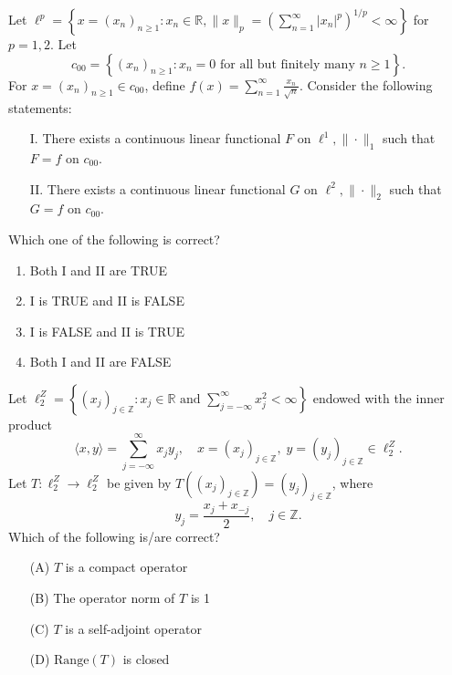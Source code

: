 \item Let $\ell^p = \left\{ x = (x_n)_{n \geq 1} : x_n \in \mathbb{R}, \|x\|_p = \left( \sum_{n=1}^\infty |x_n|^p \right)^{1/p} < \infty \right\}$ for $p = 1, 2$. Let
\[
c_{00} = \left\{ (x_n)_{n \geq 1} : x_n = 0 \text{ for all but finitely many } n \geq 1 \right\}.
\]
For $x = (x_n)_{n \geq 1} \in c_{00}$, define $f(x) = \sum_{n=1}^\infty \frac{x_n}{\sqrt{n}}$. Consider the following statements:
\begin{enumerate}
    \item[I.] There exists a continuous linear functional $F$ on $\ell^1, \|\cdot\|_1$ such that $F = f$ on $c_{00}$.
    \item[II.] There exists a continuous linear functional $G$ on $\ell^2, \|\cdot\|_2$ such that $G = f$ on $c_{00}$.
\end{enumerate}
Which one of the following is correct?
\begin{enumerate}
    \item Both I and II are TRUE
    \item I is TRUE and II is FALSE
    \item I is FALSE and II is TRUE
    \item Both I and II are FALSE
\end{enumerate}
    \item Let $\ell_2^Z = \left\{ (x_j)_{j \in \mathbb{Z}} : x_j \in \mathbb{R} \text{ and } \sum_{j=-\infty}^{\infty} x_j^2 < \infty \right\}$ endowed with the inner product
    \[
    \langle x, y \rangle = \sum_{j=-\infty}^{\infty} x_j y_j, \quad x = (x_j)_{j \in \mathbb{Z}}, \; y = (y_j)_{j \in \mathbb{Z}} \in \ell_2^Z.
    \]
    Let $T : \ell_2^Z \rightarrow \ell_2^Z$ be given by $T((x_j)_{j \in \mathbb{Z}}) = (y_j)_{j \in \mathbb{Z}}$, where
    \[
    y_j = \frac{x_j + x_{-j}}{2}, \quad j \in \mathbb{Z}.
    \]
    Which of the following is/are correct?
    \begin{enumerate}
        \item[(A)] $T$ is a compact operator
        \item[(B)] The operator norm of $T$ is 1
        \item[(C)] $T$ is a self-adjoint operator
        \item[(D)] $\text{Range}(T)$ is closed
    \end{enumerate}

    \bigskip

